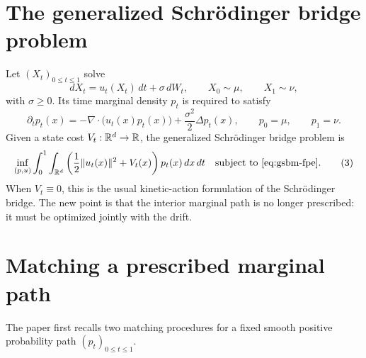 \section{The generalized Schr\"odinger bridge problem}
Let $(X_t)_{0\le t\le1}$ solve
\begin{equation}
  dX_t=u_t(X_t)\,dt+\sigma\,dW_t,
  \qquad X_0\sim\mu,
  \qquad X_1\sim\nu,
  \tag{1}\label{eq:gsbm-sde}
\end{equation}
with $\sigma\ge0$.  Its time marginal density $p_t$ is required to satisfy
\begin{equation}
  \partial_t p_t(x)
  =-\nabla\!\cdot\bigl(u_t(x)p_t(x)\bigr)
   +\frac{\sigma^2}{2}\Delta p_t(x),
  \qquad p_0=\mu,
  \qquad p_1=\nu.
  \tag{2}\label{eq:gsbm-fpe}
\end{equation}
Given a state cost $V_t:\mathbb{R}^d\to\mathbb{R}$, the generalized Schr\"odinger bridge
problem is
\begin{equation}
  \inf_{(p,u)}
  \int_0^1\int_{\mathbb{R}^d}
  \left(\frac12\|u_t(x)\|^2+V_t(x)\right)p_t(x)\,dx\,dt
  \quad\text{subject to \eqref{eq:gsbm-fpe}.}
  \tag{3}\label{eq:gsbm-main}
\end{equation}
When $V_t\equiv0$, this is the usual kinetic-action formulation of the
Schr\"odinger bridge.  The new point is that the interior marginal path is no
longer prescribed: it must be optimized jointly with the drift.

\section{Matching a prescribed marginal path}
The paper first recalls two matching procedures for a fixed smooth positive
probability path $(p_t)_{0\le t\le1}$.

